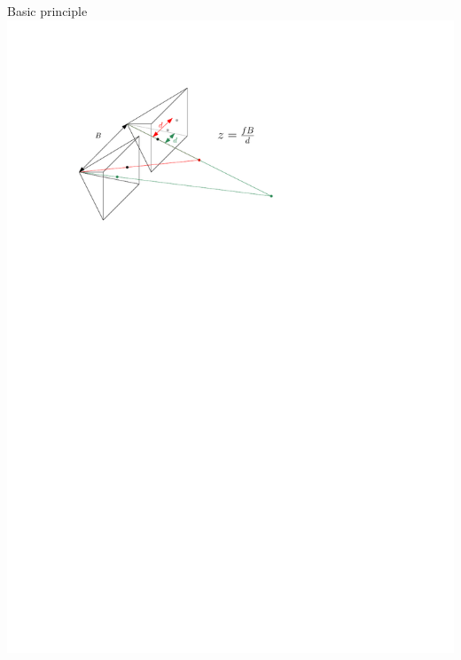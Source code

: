 \documentclass{beamer}
\begin{document}
\begin{frame}{Basic principle}
    \includegraphics[width=\textwidth]{images/stereo_2.pdf}
\end{frame}
\end{document}
